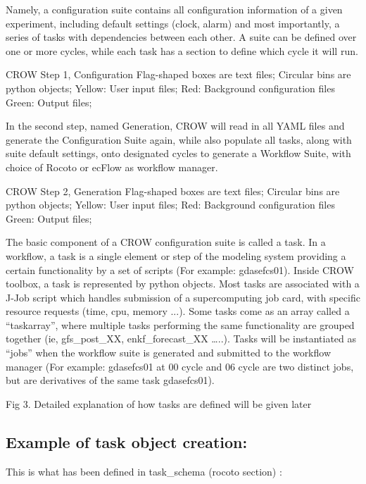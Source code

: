 Namely, a configuration suite contains all configuration information of a given experiment, including default settings (clock, alarm) and most importantly, a series of tasks with dependencies between each other. A suite can be defined over one or more cycles, while each task has a section to define which cycle it will run.

C\-R\-O\-W Step 1, Configuration Flag-\/shaped boxes are text files; Circular bins are python objects; Yellow\-: User input files; Red\-: Background configuration files Green\-: Output files;

In the second step, named Generation, C\-R\-O\-W will read in all Y\-A\-M\-L files and generate the Configuration Suite again, while also populate all tasks, along with suite default settings, onto designated cycles to generate a Workflow Suite, with choice of Rocoto or ec\-Flow as workflow manager.

C\-R\-O\-W Step 2, Generation Flag-\/shaped boxes are text files; Circular bins are python objects; Yellow\-: User input files; Red\-: Background configuration files Green\-: Output files;

The basic component of a C\-R\-O\-W configuration suite is called a task. In a workflow, a task is a single element or step of the modeling system providing a certain functionality by a set of scripts (For example\-: gdasefcs01). Inside C\-R\-O\-W toolbox, a task is represented by python objects. Most tasks are associated with a J-\/\-Job script which handles submission of a supercomputing job card, with specific resource requests (time, cpu, memory ...). Some tasks come as an array called a “taskarray”, where multiple tasks performing the same functionality are grouped together (ie, gfs\-\_\-post\-\_\-\-X\-X, enkf\-\_\-forecast\-\_\-\-X\-X …..). Tasks will be instantiated as “jobs” when the workflow suite is generated and submitted to the workflow manager (For example\-: gdasefcs01 at 00 cycle and 06 cycle are two distinct jobs, but are derivatives of the same task gdasefcs01).

Fig 3. Detailed explanation of how tasks are defined will be given later

\subsection*{Example of task object creation\-: }

This is what has been defined in task\-\_\-schema (rocoto section) \-:

